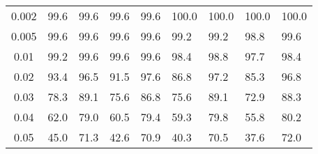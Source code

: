 \begin{table}[H]
\begin{tabular}{|c||gg|gg|gg|gg|}
		0.002 & 99.6 & 99.6 & 99.6 & 99.6 & 100.0 & 100.0 & 100.0 & 100.0 \\
		0.005 & 99.6 & 99.6 & 99.6 & 99.6 & 99.2 & 99.2 & 98.8 & 99.6 \\
		0.01 & 99.2 & 99.6 & 99.6 & 99.6 & 98.4 & 98.8 & 97.7 & 98.4 \\
		0.02 & 93.4 & 96.5 & 91.5 & 97.6 & 86.8 & 97.2 & 85.3 & 96.8 \\
		0.03 & 78.3 & 89.1 & 75.6 & 86.8 & 75.6 & 89.1 & 72.9 & 88.3 \\
		0.04 & 62.0 & 79.0 & 60.5 & 79.4 & 59.3 & 79.8 & 55.8 & 80.2 \\
		0.05 & 45.0 & 71.3 & 42.6 & 70.9 & 40.3 & 70.5 & 37.6 & 72.0 \\
    \hline
  \end{tabular}
\end{table}

